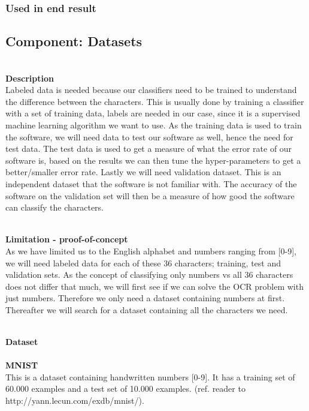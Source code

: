 \documentclass[11pt,a4paper,UKenglish]{article}
\begin{document}
\subsubsection{Used in end result}

\subsection{Component: Datasets}
\label{Method:Datasets}

\noindent \\ \textbf{Description}
\noindent \\
Labeled data is needed because our classifiers need to be trained to understand
the difference between the characters. This is usually done by training a
classifier with a set of training data, labels are needed in our case,
since it is a supervised machine learning algorithm we want to use. As the
training data is used to train the software, we will need data to test our
software as well, hence the need for test data. The test data is used to get a
measure of what the error rate of our software is, based on the results we
can then tune the hyper-parameters to get a better/smaller error rate. Lastly
we will need validation dataset. This is an independent dataset that the software
is not familiar with. The accuracy of the software on the validation set will
then be a measure of how good the software can classify the characters.

\noindent \\ \textbf{Limitation - proof-of-concept}
\noindent \\
As we have limited us to the English alphabet and numbers ranging from [0-9],
we will need labeled data for each of these 36 characters; training, test and
validation sets. As the concept of classifying only numbers vs all 36
characters does not differ that much, we will first see if we can solve the OCR
problem with just numbers. Therefore we only need a dataset containing numbers
at first. Thereafter we will search for a dataset containing all the characters
we need.

\noindent \\ \textbf{Dataset}
\noindent \\
\noindent \\ \textbf{MNIST}
\noindent \\ This is a dataset containing handwritten numbers [0-9].
It has a training set of 60.000 examples and a test set of 10.000 examples.
(ref. reader to http://yann.lecun.com/exdb/mnist/).
\end{document}
